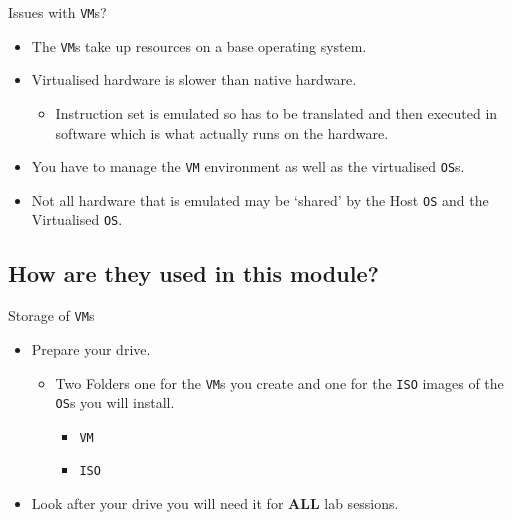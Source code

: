 \documentclass[aspectratio=169]{beamer}
\begin{document}
\begin{frame}{Issues with \texttt{VM}s?}
  \begin{itemize}
    \item The \texttt{VM}s take up resources on a base operating system.
    \item Virtualised hardware is slower than native hardware.
      \begin{itemize}
        \item Instruction set is emulated so has to be translated and then executed in software which is what actually runs on the hardware.
      \end{itemize}
    \item You have to manage the \texttt{VM} environment as well as the virtualised \texttt{OS}s.
    \item Not all hardware that is emulated may be `shared' by the Host \texttt{OS} and the Virtualised \texttt{OS}.  
  \end{itemize}
\end{frame}

\subsection{How are they used in this module?}
\begin{frame}{Storage of \texttt{VM}s}
  \begin{itemize}
    \item Prepare your drive.
      \begin{itemize}
        \item Two Folders one for the \texttt{VM}s you create and one for the \texttt{ISO} images of the \texttt{OS}s you will install.
        \begin{itemize}
          \item \texttt{VM}
          \item \texttt{ISO}
        \end{itemize}  
      \end{itemize}
    \item Look after your drive you will need it for \textbf{ALL} lab sessions.
  \end{itemize}
\end{frame}
\end{document}
